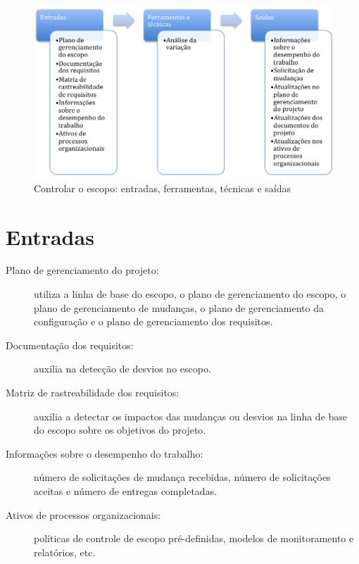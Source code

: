 \begin{figure}[!h]
	\centering
	\includegraphics[scale=0.5]{Figuras/escopo_efts_controlar.png}
	\caption{Controlar o escopo: entradas, ferramentas, técnicas e saídas}
	\label{fig:escopo:controlar:efts}
\end{figure}

\section{Entradas}

\begin{description}
	
	\item[Plano de gerenciamento do projeto:] utiliza a linha de base do escopo, o plano de gerenciamento do escopo, o plano de gerenciamento de mudanças, o plano de gerenciamento da configuração e o plano de gerenciamento dos requisitos.
	
	\item[Documentação dos requisitos:] auxilia na detecção de desvios no escopo.
	
	\item[Matriz de rastreabilidade dos requisitos:] auxilia a detectar os impactos das mudanças ou desvios na linha de base do escopo sobre os objetivos do projeto. 
	
	\item[Informações sobre o desempenho do trabalho:] número de solicitações de mudança recebidas, número de solicitações aceitas e número de entregas completadas.
	
	\item[Ativos de processos organizacionais:] políticas de controle de escopo pré-definidas, modelos de monitoramento e relatórios, etc.
	
\end{description}

